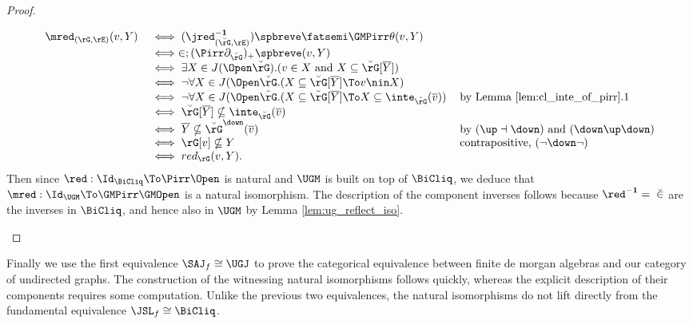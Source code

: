 \documentclass{article}
\begin{document}
\begin{proof}
\begin{enumerate}
\[
\begin{tabular}{lll}
$\mred_{(\rG,\rE)}(v,Y)$
&
$\iff (\jred_{(\breve{\rG},\rE)}^{\bf-1})\spbreve \fatsemi \GMPirr \theta(v,Y)$
\\&
$\iff \in ; (\Pirr\partial_{\breve{\rG}})_+\spbreve(v,Y)$
\\&
$\iff \exists X \in J(\Open\breve{\rG}).( v \in X \text{ and } X \subseteq \breve{\rG}[\overline{Y}]  )$
\\&
$\iff \neg \forall X \in J(\Open\breve{\rG}.( X \subseteq \breve{\rG}[\overline{Y}] \To v \nin X)$
\\&
$\iff \neg \forall X \in J(\Open\breve{\rG}.( X \subseteq \breve{\rG}[\overline{Y}] \To X \subseteq \inte_{\breve{\rG}}(\overline{v}) )$
& by Lemma \ref{lem:cl_inte_of_pirr}.1
\\&
$\iff \breve{\rG}[\overline{Y}] \nsubseteq \inte_{\breve{\rG}}(\overline{v})$
\\&
$\iff \overline{Y} \nsubseteq \breve{\rG}^\down(\overline{v})$
& by $(\up\dashv\down)$ and $(\down\up\down)$
\\&
$\iff \rG[v] \nsubseteq Y$
& contrapositive, $(\neg\down\neg)$
\\&
$\iff red_\rG(v,Y)$.
\end{tabular}
\]
Then since $\red : \Id_{\BiCliq} \To \Pirr\Open$ is natural and $\UGM$ is built on top of $\BiCliq$, we deduce that $\mred : \Id_{\UGM} \To \GMPirr\GMOpen$ is a natural isomorphism. The description of the component inverses follows because $\red^{\bf-1} = \; \breve{\in}$ are the inverses in $\BiCliq$, and hence also in $\UGM$ by Lemma \ref{lem:ug_reflect_iso}.

\end{enumerate}
\end{proof}


\smallskip
Finally we use the first equivalence $\SAJ_f \cong \UGJ$ to prove the categorical equivalence between finite de morgan algebras and our category of undirected graphs. The construction of the witnessing natural isomorphisms follows quickly, whereas the explicit description of their components requires some computation. Unlike the previous two equivalences, the natural isomorphisms do not lift directly from the fundamental equivalence $\JSL_f \cong \BiCliq$.
\smallskip


\end{document}
